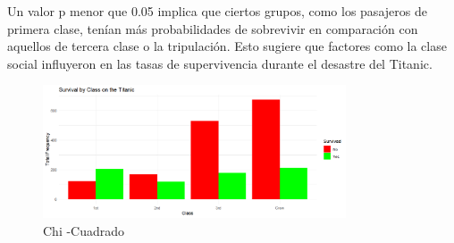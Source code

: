 \documentclass{article}
\begin{document}
Un valor p menor que 0.05 implica que ciertos grupos, como los pasajeros de primera clase, tenían más probabilidades de sobrevivir en comparación con aquellos de tercera clase o la tripulación. Esto sugiere que factores como la clase social influyeron en las tasas de supervivencia durante el desastre del Titanic.
\begin{figure}[h] %
    \centering %
    \includegraphics[width=0.8\textwidth]{Chi.png}
    \caption{Chi -Cuadrado } %
    \label{fig:mi_imagen} %
\end{figure}
\end{document}
